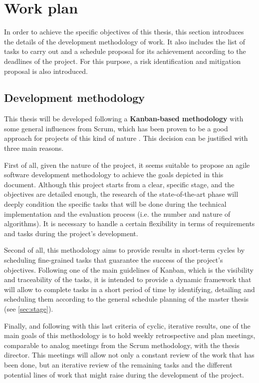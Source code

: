 \documentclass[11pt]{article}
\begin{document}
\section{Work plan}

In order to achieve the specific objectives of this thesis, this section introduces the details of the development methodology of work. It also includes the list of tasks to carry out and a schedule proposal for its achievement according to the deadlines of the project. For this purpose, a risk identification and mitigation proposal is also introduced.

\subsection{Development methodology}

This thesis will be developed following a \textbf{Kanban-based methodology} with some general influences from Scrum, which has been proven to be a good approach for projects of this kind of nature \cite{kanban}. This decision can be justified with three main reasons.

First of all, given the nature of the project, it seems suitable to propose an agile software development methodology to achieve the goals depicted in this document. Although this project starts from a clear, specific stage, and the objectives are detailed enough, the research of the state-of-the-art phase will deeply condition the specific tasks that will be done during the technical implementation and the evaluation process (i.e. the number and nature of algorithms). It is necessary to handle a certain flexibility in terms of requirements and tasks during the project's development. 

Second of all, this methodology aims to provide results in short-term cycles by scheduling fine-grained tasks that guarantee the success of the project's objectives. Following one of the main guidelines of Kanban, which is the visibility and traceability of the tasks, it is intended to provide a dynamic framework that will allow to complete tasks in a short period of time by identifying, detailing and scheduling them according to the general schedule planning of the master thesis (see \ref{sec:stage}).

Finally, and following with this last criteria of cyclic, iterative results, one of the main goals of this methodology is to hold weekly retrospective and plan meetings, comparable to analog meetings from the Scrum methodology, with the thesis director. This meetings will allow not only a constant review of the work that has been done, but an iterative review of the remaining tasks and the different potential lines of work that might raise during the development of the project. 
\end{document}
